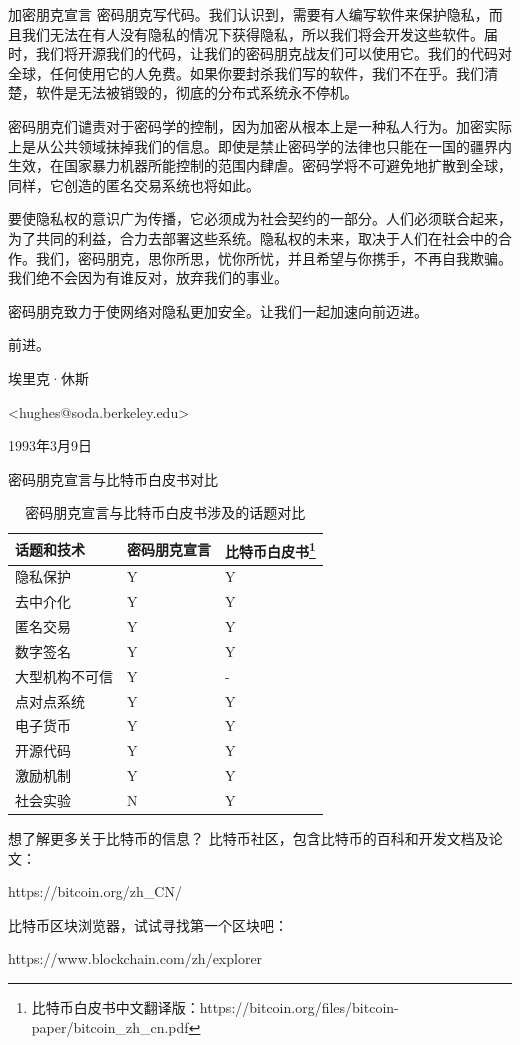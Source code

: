 \documentclass[11pt]{beamer}
\begin{document}
\begin{frame}[allowframebreaks]{加密朋克宣言}
	密码朋克写代码。我们认识到，需要有人编写软件来保护隐私，而且我们无法在有人没有隐私的情况下获得隐私，所以我们将会开发这些软件。届时，我们将开源我们的代码，让我们的密码朋克战友们可以使用它。我们的代码对全球，任何使用它的人免费。如果你要封杀我们写的软件，我们不在乎。{\color{red}我们清楚，软件是无法被销毁的，彻底的分布式系统永不停机}。
	
	密码朋克们谴责对于密码学的控制，因为加密从根本上是一种私人行为。加密实际上是从公共领域抹掉我们的信息。即使是禁止密码学的法律也只能在一国的疆界内生效，在国家暴力机器所能控制的范围内肆虐。{\color{red}密码学将不可避免地扩散到全球，同样，它创造的匿名交易系统也将如此}。
	
	要使隐私权的意识广为传播，它必须成为社会契约的一部分。{\color{red}人们必须联合起来，为了共同的利益，合力去部署这些系统}。隐私权的未来，取决于人们在社会中的合作。我们，密码朋克，思你所思，忧你所忧，并且希望与你携手，不再自我欺骗。我们绝不会因为有谁反对，放弃我们的事业。
	
	密码朋克致力于使网络对隐私更加安全。让我们一起加速向前迈进。
	
	前进。
	
	埃里克·休斯
	
	<hughes@soda.berkeley.edu>
	
	1993年3月9日
	
\end{frame}

\begin{frame}{密码朋克宣言与比特币白皮书对比}
	\begin{table}[]
		\begin{tabular}{@{}lll@{}}
			\toprule
			话题和技术     & 密码朋克宣言 & 比特币白皮书\footnote{比特币白皮书中文翻译版：https://bitcoin.org/files/bitcoin-paper/bitcoin\_zh\_cn.pdf} \\ \midrule
			隐私保护       & Y      & Y      \\
			去中介化      & Y      & Y      \\
			匿名交易      & Y      & Y      \\
			数字签名      & Y      & Y      \\
			大型机构不可信 & Y   & - \\
			点对点系统     & Y      & Y      \\
			电子货币      & Y      & Y      \\
			开源代码      & Y      & Y      \\
			激励机制      & Y      & Y      \\ 
			社会实验      & N      & Y      \\
			\bottomrule
		\end{tabular}
		\caption{密码朋克宣言与比特币白皮书涉及的话题对比}
		\label{tab:ccb}
	\end{table}
\end{frame}

\begin{frame}{想了解更多关于比特币的信息？}
	\centering
比特币社区，包含比特币的百科和开发文档及论文：

https://bitcoin.org/zh\_CN/

\hfil

比特币区块浏览器，试试寻找第一个区块吧：

https://www.blockchain.com/zh/explorer

\end{frame}
\end{document}
